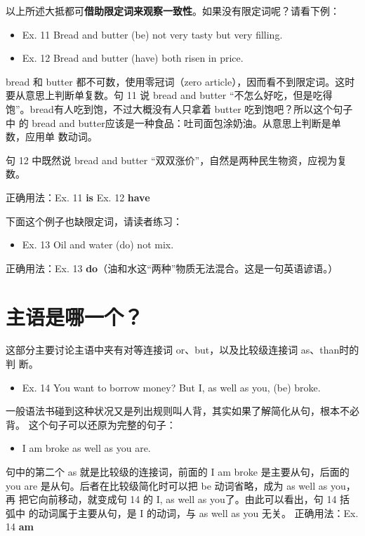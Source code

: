以上所述大抵都可\textbf{借助限定词来观察一致性}。如果没有限定词呢？请看下例：
\begin{mybox}
  \begin{itemize}
  \item   Ex. 11 Bread and butter (be) not very tasty but very filling.
  \item   Ex. 12 Bread and butter (have) both risen in price.
  \end{itemize}

  bread 和 butter 都不可数，使用零冠词（zero article），因而看不到限定词。这时
  要从意思上判断单复数。句 11 说 bread and butter “不怎么好吃，但是吃得
  饱”。bread有人吃到饱，不过大概没有人只拿着 butter 吃到饱吧？所以这个句子中
  的 bread and butter应该是一种食品：吐司面包涂奶油。从意思上判断是单数，应用单
  数动词。

  句 12 中既然说 bread and butter “双双涨价”，自然是两种民生物资，应视为复
  数。

  \tcblower

  正确用法：Ex. 11 \textbf{is} \qquad\quad Ex. 12 \textbf{have}
\end{mybox}

下面这个例子也缺限定词，请读者练习：
\begin{mybox}
  \begin{itemize}
  \item   Ex. 13 Oil and water (do) not mix.
  \end{itemize}
  \tcblower
  正确用法：Ex. 13 \textbf{do}（油和水这“两种”物质无法混合。这是一句英语谚语。）
\end{mybox}

\section{主语是哪一个？}

这部分主要讨论主语中夹有对等连接词 or、but，以及比较级连接词 as、than时的判
断。
\begin{mybox}
  \begin{itemize}
  \item   Ex. 14 You want to borrow money? But I, as well as you, (be) broke.
  \end{itemize}
  一般语法书碰到这种状况又是列出规则叫人背，其实如果了解简化从句，根本不必背。
  这个句子可以还原为完整的句子：
  \begin{itemize}
  \item   I am broke as well as you are.
  \end{itemize}
  句中的第二个 as 就是比较级的连接词，前面的 I am broke 是主要从句，后面的you
  are 是从句。后者在比较级简化时可以把 be 动词省略，成为 as well as you，再
  把它向前移动，就变成句 14 的 I, as well as you了。由此可以看出，句 14 括弧中
  的动词属于主要从句，是 I 的动词，与 as well as you 无关。
  \tcblower
  正确用法：Ex. 14 \textbf{am}
\end{mybox}


